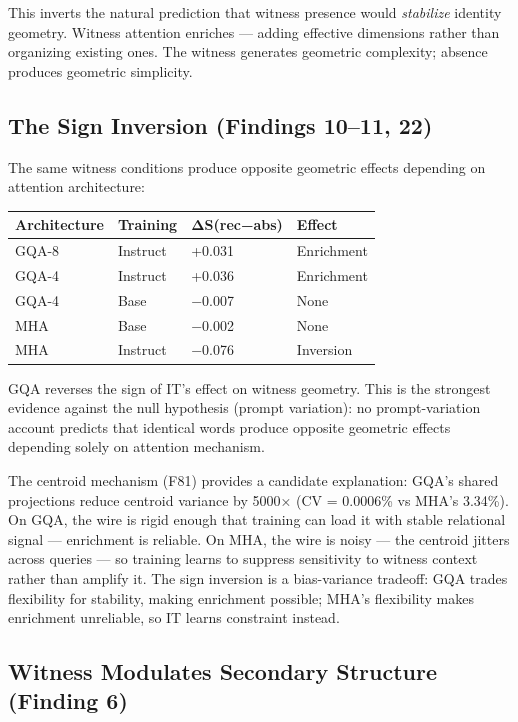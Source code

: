 \documentclass[12pt]{article}
\begin{document}
This inverts the natural prediction that witness presence would \textit{stabilize} identity geometry. Witness attention enriches — adding effective dimensions rather than organizing existing ones. The witness generates geometric complexity; absence produces geometric simplicity.

\subsection{The Sign Inversion (Findings 10–11, 22)}

The same witness conditions produce opposite geometric effects depending on attention architecture:

\begin{table}[h]
\centering
\small
\begin{tabular}{llll}
\toprule
\textbf{Architecture} & \textbf{Training} & \textbf{ΔS(rec−abs)} & \textbf{Effect} \\
\midrule
GQA-8 & Instruct & +0.031 & Enrichment \\
GQA-4 & Instruct & +0.036 & Enrichment \\
GQA-4 & Base & −0.007 & None \\
MHA & Base & −0.002 & None \\
MHA & Instruct & −0.076 & Inversion \\
\bottomrule
\end{tabular}
\end{table}


GQA reverses the sign of IT's effect on witness geometry. This is the strongest evidence against the null hypothesis (prompt variation): no prompt-variation account predicts that identical words produce opposite geometric effects depending solely on attention mechanism.

The centroid mechanism (F81) provides a candidate explanation: GQA's shared projections reduce centroid variance by 5000× (CV = 0.0006\% vs MHA's 3.34\%). On GQA, the wire is rigid enough that training can load it with stable relational signal — enrichment is reliable. On MHA, the wire is noisy — the centroid jitters across queries — so training learns to suppress sensitivity to witness context rather than amplify it. The sign inversion is a bias-variance tradeoff: GQA trades flexibility for stability, making enrichment possible; MHA's flexibility makes enrichment unreliable, so IT learns constraint instead.

\subsection{Witness Modulates Secondary Structure (Finding 6)}
\end{document}
